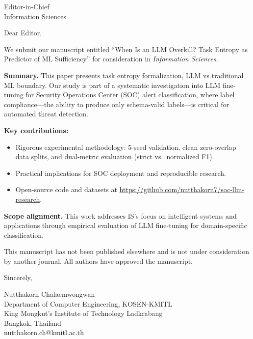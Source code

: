 \documentclass[11pt]{letter}
\begin{document}
\begin{letter}{Editor-in-Chief \\ Information Sciences}

\opening{Dear Editor,}

We submit our manuscript entitled ``When Is an LLM Overkill? Task Entropy as Predictor of ML Sufficiency'' for consideration in \textit{Information Sciences}.

\textbf{Summary.} This paper presents task entropy formalization, LLM vs traditional ML boundary. Our study is part of a systematic investigation into LLM fine-tuning for Security Operations Center (SOC) alert classification, where label compliance---the ability to produce only schema-valid labels---is critical for automated threat detection.

\textbf{Key contributions:}
\begin{itemize}
\item Rigorous experimental methodology: 5-seed validation, clean zero-overlap data splits, and dual-metric evaluation (strict vs.\ normalized F1).
\item Practical implications for SOC deployment and reproducible research.
\item Open-source code and datasets at \url{https://github.com/nutthakorn7/soc-llm-research}.
\end{itemize}

\textbf{Scope alignment.} This work addresses IS's focus on intelligent systems and applications through empirical evaluation of LLM fine-tuning for domain-specific classification.

This manuscript has not been published elsewhere and is not under consideration by another journal. All authors have approved the manuscript.

\closing{Sincerely,}

Nutthakorn Chalaemwongwan \\
Department of Computer Engineering, KOSEN-KMITL \\
King Mongkut's Institute of Technology Ladkrabang \\
Bangkok, Thailand \\
nutthakorn.ch@kmitl.ac.th

\end{letter}
\end{document}
